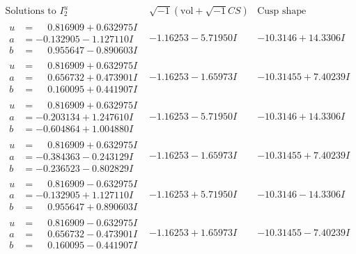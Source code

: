 \documentclass[1p]{elsarticle_modified}
\theoremstyle{definition}
\newcommand{\I}{\sqrt{-1}}
\begin{document}
$$\begin{array}{c|c|c}  
\text{Solutions to }I^u_{2}& \I (\text{vol} + \sqrt{-1}CS) & \text{Cusp shape}\\
 \hline 
\begin{aligned}
u &= \phantom{-}0.816909 + 0.632975 I \\
a &= -0.132905 - 1.127110 I \\
b &= \phantom{-}0.955647 - 0.890603 I\end{aligned}
 & -1.16253 - 5.71950 I & -10.3146 + 14.3306 I \\ \hline\begin{aligned}
u &= \phantom{-}0.816909 + 0.632975 I \\
a &= \phantom{-}0.656732 + 0.473901 I \\
b &= \phantom{-}0.160095 + 0.441907 I\end{aligned}
 & -1.16253 - 1.65973 I & -10.31455 + 7.40239 I \\ \hline\begin{aligned}
u &= \phantom{-}0.816909 + 0.632975 I \\
a &= -0.203134 + 1.247610 I \\
b &= -0.604864 + 1.004880 I\end{aligned}
 & -1.16253 - 5.71950 I & -10.3146 + 14.3306 I \\ \hline\begin{aligned}
u &= \phantom{-}0.816909 + 0.632975 I \\
a &= -0.384363 - 0.243129 I \\
b &= -0.236523 - 0.802829 I\end{aligned}
 & -1.16253 - 1.65973 I & -10.31455 + 7.40239 I \\ \hline\begin{aligned}
u &= \phantom{-}0.816909 - 0.632975 I \\
a &= -0.132905 + 1.127110 I \\
b &= \phantom{-}0.955647 + 0.890603 I\end{aligned}
 & -1.16253 + 5.71950 I & -10.3146 - 14.3306 I \\ \hline\begin{aligned}
u &= \phantom{-}0.816909 - 0.632975 I \\
a &= \phantom{-}0.656732 - 0.473901 I \\
b &= \phantom{-}0.160095 - 0.441907 I\end{aligned}
 & -1.16253 + 1.65973 I & -10.31455 - 7.40239 I \\ \hline\begin{aligned}

\end{aligned}
\end{array}$$
\end{document}
